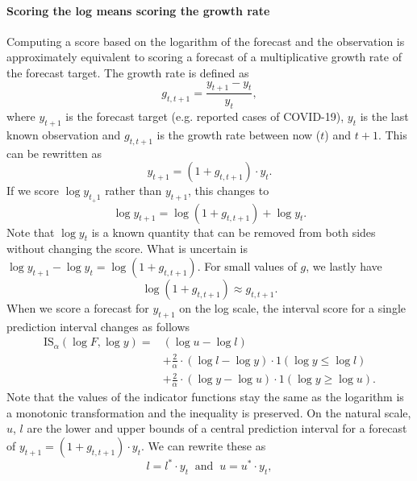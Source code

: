 \documentclass{article}
\begin{document}
\paragraph{Scoring the log means scoring the growth rate} Computing a score based on the logarithm of the forecast and the observation is approximately equivalent to scoring a forecast of a multiplicative growth rate of the forecast target. The growth rate is defined as 
%
\begin{equation}
    g_{t, t+1} = \frac{y_{t+1} - y_t}{y_t},
\end{equation}
%
where $y_{t+1}$ is the forecast target (e.g. reported cases of COVID-19), $y_t$ is the last known observation and $g_{t, t+1}$ is the growth rate between now ($t$) and $t+1$. This can be rewritten as 
%
\begin{equation}
y_{t+1} = (1 + g_{t, t+1}) \cdot y_t.
\end{equation}
%
If we score $\log y_{t_+1}$ rather than $y_{t+1}$, this changes to 
%
\begin{equation}
\log y_{t+1} = \log (1 + g_{t, t+1}) + \log y_t.    
\end{equation}
%
Note that $\log y_t$ is a known quantity that can be removed from both sides without changing the score. What is uncertain is $\log y_{t+1} - \log y_t = \log (1 + g_{t, t+1})$.  For small values of $g$, we lastly have 
\begin{equation}
    \log (1+ g_{t, t+1}) \approx g_{t, t+1}.
\end{equation}
%
When we score a forecast for $y_{t+1}$ on the log scale, the interval score for a single prediction interval changes as follows
%
\begin{align}
    \text{IS}_\alpha(\log F, \log y) = &(\log u - \log l) \\ 
    &+ \frac{2}{\alpha} \cdot (\log l - \log y) \cdot 1(\log y \leq \log l) \\
    &+ \frac{2}{\alpha} \cdot (\log y - \log u) \cdot 1(\log y \geq \log u).
\end{align}
%
Note that the values of the indicator functions stay the same as the logarithm is a monotonic transformation and the inequality is preserved. 
On the natural scale, $u$, $l$ are the lower and upper bounds of a central prediction interval for a forecast of $y_{t+1} = (1 + g_{t, t+1}) \cdot y_t$. 
We can rewrite these as 
\begin{equation}
   l = l^* \cdot y_t 
   \;\; \text{and} \;\; 
   u = u^* \cdot y_t,  
\end{equation}
\end{document}
